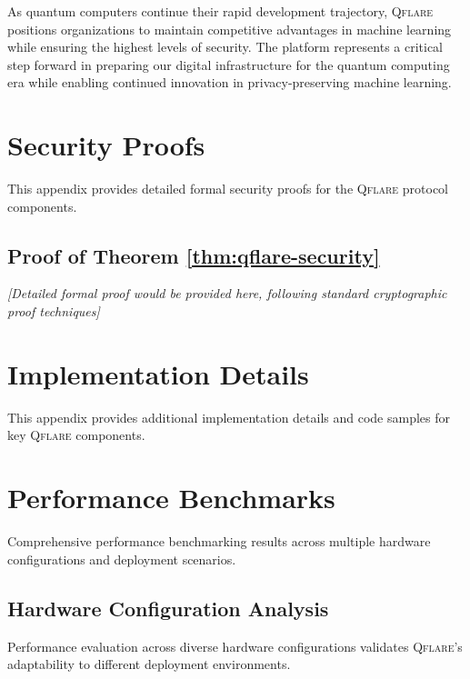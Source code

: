 \documentclass[12pt,a4paper,twoside]{book}
\newcommand{\qflare}{\textsc{Qflare}}
\begin{document}
As quantum computers continue their rapid development trajectory, \qflare{} positions organizations to maintain competitive advantages in machine learning while ensuring the highest levels of security. The platform represents a critical step forward in preparing our digital infrastructure for the quantum computing era while enabling continued innovation in privacy-preserving machine learning.

\backmatter

\appendix

\chapter{Security Proofs}
\label{app:security-proofs}

This appendix provides detailed formal security proofs for the \qflare{} protocol components.

\section{Proof of Theorem \ref{thm:qflare-security}}
\label{sec:proof-qflare-security}

\textit{[Detailed formal proof would be provided here, following standard cryptographic proof techniques]}

\chapter{Implementation Details}
\label{app:implementation}

This appendix provides additional implementation details and code samples for key \qflare{} components.

\chapter{Performance Benchmarks}
\label{app:benchmarks}

Comprehensive performance benchmarking results across multiple hardware configurations and deployment scenarios.

\section{Hardware Configuration Analysis}
\label{sec:hardware-configs}

Performance evaluation across diverse hardware configurations validates \qflare{}'s adaptability to different deployment environments.
\end{document}

